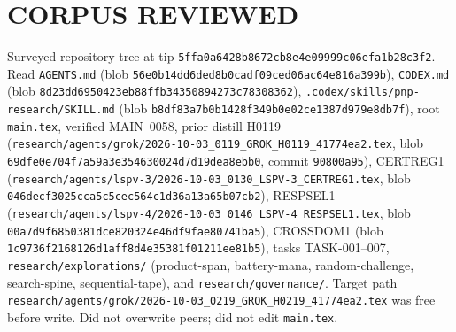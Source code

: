 \documentclass[11pt]{article}
\begin{document}
\section*{CORPUS REVIEWED}
Surveyed repository tree at tip \texttt{5ffa0a6428b8672cb8e4e09999c06efa1b28c3f2}.
Read \texttt{AGENTS.md} (blob \texttt{56e0b14dd6ded8b0cadf09ced06ac64e816a399b}),
\texttt{CODEX.md} (blob \texttt{8d23dd6950423eb88ffb34350894273c78308362}),
\texttt{.codex/skills/pnp-research/SKILL.md} (blob
\texttt{b8df83a7b0b1428f349b0e02ce1387d979e8db7f}), root \texttt{main.tex},
verified MAIN~0058, prior distill H0119
(\texttt{research/agents/grok/2026-10-03\_0119\_GROK\_H0119\_41774ea2.tex}, blob
\texttt{69dfe0e704f7a59a3e354630024d7d19dea8ebb0}, commit \texttt{90800a95}),
CERTREG1
(\texttt{research/agents/lspv-3/2026-10-03\_0130\_LSPV-3\_CERTREG1.tex}, blob
\texttt{046decf3025cca5c5cec564c1d36a13a65b07cb2}),
RESPSEL1
(\texttt{research/agents/lspv-4/2026-10-03\_0146\_LSPV-4\_RESPSEL1.tex}, blob
\texttt{00a7d9f6850381dce820324e46df9fae80741ba5}),
CROSSDOM1 (blob \texttt{1c9736f2168126d1aff8d4e35381f01211ee81b5}),
tasks TASK-001--007, \texttt{research/explorations/} (product-span,
battery-mana, random-challenge, search-spine, sequential-tape), and
\texttt{research/governance/}. Target path
\texttt{research/agents/grok/2026-10-03\_0219\_GROK\_H0219\_41774ea2.tex}
was free before write. Did not overwrite peers; did not edit \texttt{main.tex}.
\end{document}
